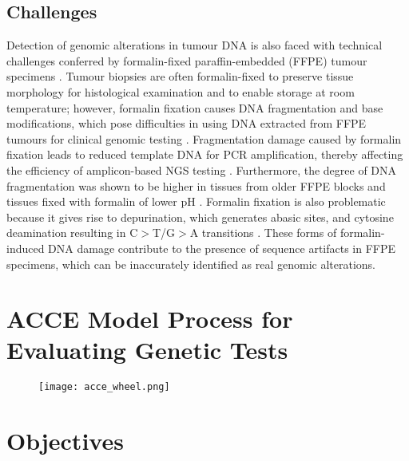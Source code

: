 \subsection{Challenges}
Detection of genomic alterations in tumour DNA is also faced with technical challenges conferred by formalin-fixed paraffin-embedded (FFPE) tumour specimens \cite{Do2015,Wong2014}. Tumour biopsies are often formalin-fixed to preserve tissue morphology for histological examination and to enable storage at room temperature; however, formalin fixation causes DNA fragmentation and base modifications, which pose difficulties in using DNA extracted from FFPE tumours for clinical genomic testing \cite{Do2015,Wong2014}. Fragmentation damage caused by formalin fixation leads to reduced template DNA for PCR amplification, thereby affecting the efficiency of amplicon-based NGS testing \cite{Do2015,Wong2014}. Furthermore, the degree of DNA fragmentation was shown to be higher in tissues from older FFPE blocks and tissues fixed with formalin of lower pH \cite{Do2015}. Formalin fixation is also problematic because it gives rise to depurination, which generates abasic sites, and cytosine deamination resulting in C$>$T/G$>$A transitions \cite{Do2015}. These forms of formalin-induced DNA damage contribute to the presence of sequence artifacts in FFPE specimens, which can be inaccurately identified as real genomic alterations.

\section{ACCE Model Process for Evaluating Genetic Tests}
\label{sec:ACCEModelProcessforEvaluatingGeneticTests}




\begin{figure}[H]
	\centering
	\texttt{[image: acce\_wheel.png]}
	\caption{}
	\label{fig:acce_wheel}
\end{figure}



\section{Objectives}
\label{sec:Objectives}

